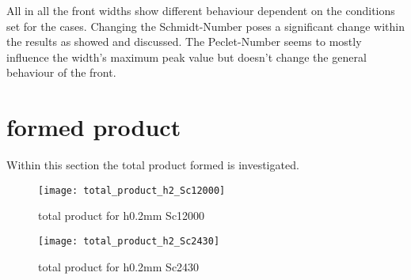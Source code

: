 \documentclass[../thesis.tex]{subfiles}
\begin{document}
All in all the front widths show different behaviour dependent on the conditions set for the cases. Changing the Schmidt-Number poses a significant change within the results as showed and discussed. The Peclet-Number seems to mostly influence the width's maximum peak value but doesn't change the general behaviour of the front.

\section{formed product}

Within this section the total product formed is investigated.

\begin{figure}[htbp]
	\centering
	\texttt{[image: total\_product\_h2\_Sc12000]}
	\caption{total product for h0.2mm Sc12000\label{fig: total_prod_h2_Sc12000}}\bigskip
	\texttt{[image: total\_product\_h2\_Sc2430]}
	\caption{total product for h0.2mm Sc2430\label{fig: total_prod_h2_Sc2430}}
\end{figure}
\end{document}
